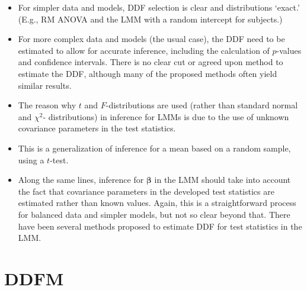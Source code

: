 \documentclass[
  9pt,
  ignorenonframetext,
]{beamer}
\begin{document}
\begin{frame}{}
\protect\hypertarget{section}{}
\begin{itemize}
\item
  For simpler data and models, DDF selection is clear and distributions
  `exact.' (E.g., RM ANOVA and the LMM with a random intercept for
  subjects.)
\item
  For more complex data and models (the usual case), the DDF need to be
  estimated to allow for accurate inference, including the calculation
  of \(p\)-values and confidence intervals. There is no clear cut or
  agreed upon method to estimate the DDF, although many of the proposed
  methods often yield similar results.
\item
  The reason why \(t\) and \(F\)-distributions are used (rather than
  standard normal and \(\chi^2\)- distributions) in inference for LMMs
  is due to the use of unknown covariance parameters in the test
  statistics.
\item
  This is a generalization of inference for a mean based on a random
  sample, using a \(t\)-test.
\item
  Along the same lines, inference for \(\pmb \beta\) in the LMM should
  take into account the fact that covariance parameters in the developed
  test statistics are estimated rather than known values. Again, this is
  a straightforward process for balanced data and simpler models, but
  not so clear beyond that. There have been several methods proposed to
  estimate DDF for test statistics in the LMM.
\end{itemize}
\end{frame}

\hypertarget{ddfm}{%
\section{DDFM}\label{ddfm}}
\end{document}
